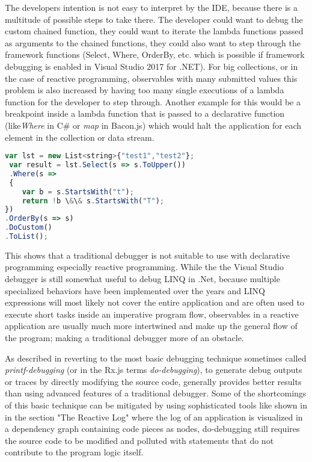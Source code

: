 The developers intention is not easy to interpret by the IDE, because there is a multitude of possible steps to take there. The developer could want to debug the custom chained function, they could want to iterate the lambda functions passed as arguments to the chained functions, they could also want to step through the framework functions (Select, Where, OrderBy, etc. which is possible if framework debugging is enabled in Visual Studio 2017 for .NET). 
For big collections, or in the case of reactive programming, observables with many submitted values this problem is also increased by having too many single executions of a lambda function for the developer to step through. Another example for this would be a breakpoint inside a lambda function that is passed to a declarative function (like\emph{Where} in C\# or \emph{map} in Bacon.js) which would halt the application for each element in the collection or data stream.

\begin{lstlisting}[language=JavaScript, caption={Simple example of .NET LINQ in C\# to show the steps the visual stidio 2017 for .NET debugger takes while debuggin step-by-step.},label={lst:CSharp_LINQ}]
 var lst = new List<string>{"test1","test2"};
 var result = lst.Select(s => s.ToUpper())
 .Where(s =>
 {
	var b = s.StartsWith("t");
	return !b \&\& s.StartsWith("T");
})
.OrderBy(s => s)
.DoCustom()
.ToList();
\end{lstlisting}


This shows that a traditional debugger is not suitable to use with declarative programming especially reactive programming. While the the Visual Studio debugger is still somewhat useful to debug LINQ in .Net, because multiple specialized behaviors have been implemented over the years and LINQ expressions will most likely not cover the entire application and are often used to execute short tasks inside an imperative program flow, observables in a reactive application are usually much more intertwined and make up the general flow of the program; making a traditional debugger more of an obstacle.

As described in \cite{MSDN_DebugginObservables} reverting to the most basic debugging technique sometimes called \emph{printf-debugging} (or in the Rx.js terms \emph{do-debugging}), to generate debug outputs or traces by directly modifying the source code, generally provides better results than using advanced features of a traditional debugger.
Some of the shortcomings of this basic technique can be mitigated by using sophisticated tools like shown in \cite{ShinyGraphFromLog} in the section "The Reactive Log" where the log of an application is visualized in a dependency graph containing code pieces as nodes, do-debugging still requires the source code to be modified and polluted with statements that do not contribute to the program logic itself.


